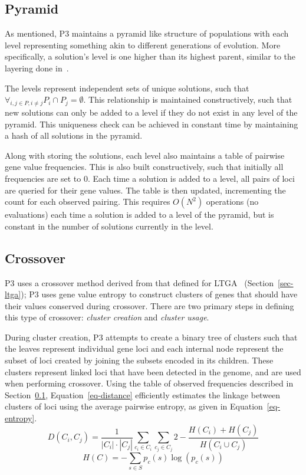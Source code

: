 \documentclass{sig-alternate}
\begin{document}
\subsection{Pyramid}
\label{sec-pyramid}
As mentioned, P3 maintains a pyramid like structure of populations
with each level representing something akin to different generations
of evolution. More specifically, a solution's level is one higher than
its highest parent, similar to the layering done
in~\cite{hornby:2006:alps}.

The levels represent independent sets of unique solutions, such that
$\forall_{i, j \in P, i \neq j} P_i \cap P_j = \emptyset$.  This relationship
is maintained constructively, such that new solutions can only be added to a level
if they do not exist in any level of the pyramid.  This uniqueness check can be
achieved in constant time by maintaining a hash of all solutions in the pyramid.

Along with storing the solutions, each level also maintains a table of pairwise
gene value frequencies.  This is also built constructively, such that initially
all frequencies are set to 0.  Each time a solution is added to a level, all
pairs of loci are queried for their gene values.  The table is then updated,
incrementing the count for each observed pairing.  This requires $O(N^2)$ operations
(no evaluations) each time a solution is added to a level of the pyramid, but is
constant in the number of solutions currently in the level.

\subsection{Crossover}
\label{sec-crossover}
P3 uses a crossover method derived from that defined for LTGA~\cite{thierens:2013:ltgahiff}
(Section~\ref{sec-ltga});
P3 uses gene value entropy to construct clusters of genes that should have their values
conserved during crossover.  There are two primary steps in
defining this type of crossover: \emph{cluster creation} and \emph{cluster usage}.

During cluster creation, P3 attempts to create a binary tree of clusters such that the leaves
represent individual gene loci and each internal node represent the subset of loci created
by joining the subsets encoded in its children.  These clusters represent linked
loci that have been detected in the genome, and are used when performing crossover.
Using the table of observed frequencies described in Section~\ref{sec-pyramid}, Equation~\ref{eq-distance}
efficiently estimates the linkage between clusters of loci using the average pairwise
entropy, as given in Equation~\ref{eq-entropy}.
\begin{equation}
  D(C_i,C_j) = \frac{1}{\left | C_i \right |\cdot \left |C_j \right|}\sum_{c_i \in C_i}\sum_{c_j \in C_j} 
  2 - \frac{H(C_i) + H(C_j)}{H(C_i \cup C_j)}
  \label{eq-distance}
\end{equation}
\begin{equation}
  H(C) = -\sum_{s\in S} p_c(s)\log(p_c(s))
  \label{eq-entropy}
\end{equation}
\end{document}
